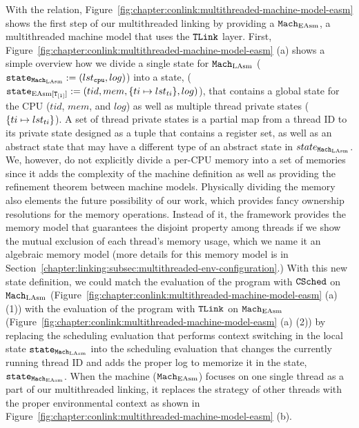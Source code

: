 With the relation, 
Figure~\ref{fig:chapter:conlink:multithreaded-machine-model-easm} shows
the first step of our multithreaded linking by providing 
a ${\mathrm{\texttt{Mach}}}_{\mathrm{EAsm}}$, a multithreaded machine model that uses the ${{\mathrm{\texttt{TLink}}}}$ layer.
First,  Figure~\ref{fig:chapter:conlink:multithreaded-machine-model-easm} (a)
shows a simple overview how we divide a single state for ${\mathrm{\texttt{Mach}}}_{\mathrm{LAsm}}$  (${\mathrm{\texttt{state}}}_{{\mathrm{\texttt{Mach}}}_{\mathrm{LAsm}}} := (lst_{{\mathrm{\texttt{cpu}}}}, log)$)
into a state, (${\mathrm{\texttt{state}}}_{\mathrm{EAsm}[{{\mathrm{\texttt{T}}}_{[1]}}]} := (tid, mem, \{ti \mapsto lst_{ti}\}, log)$),
that contains a global state for the CPU ($tid$, $mem$, and $log$) as well as 
multiple thread private states ($\{ti \mapsto lst_{ti}\}$).
A set of thread private states is a partial map from a thread ID to its private state designed as a tuple that contains
a register set, as well as an abstract state that may have a different type of an abstract state in $state_{{\mathrm{\texttt{Mach}}}_{\mathrm{LAsm}}}$. 
We, however, do not explicitly divide a per-CPU memory into a  set of memories since 
it adds the complexity of the machine definition as well as providing the 
refinement theorem between machine models.
Physically dividing the memory also elements the future possibility of our work, which provides fancy ownership resolutions
for the memory operations.
Instead of it, the framework provides the memory model 
that guarantees the disjoint property among threads if we show the mutual exclusion of each thread's memory usage, which we name it an algebraic memory model (more details for this memory model is in Section~\ref{chapter:linking:subsec:multithreaded-env-configuration}.)
With this new state definition, 
we could match the evaluation of the program with ${{\mathrm{\texttt{CSched}}}}$ on ${\mathrm{\texttt{Mach}}}_{\mathrm{LAsm}}$ (Figure~\ref{fig:chapter:conlink:multithreaded-machine-model-easm} (a) (1)) with  the evaluation of the program with ${{\mathrm{\texttt{TLink}}}}$ on ${\mathrm{\texttt{Mach}}}_{\mathrm{EAsm}}$
(Figure~\ref{fig:chapter:conlink:multithreaded-machine-model-easm} (a) (2)) 
by replacing the scheduling evaluation that performs context switching in the local state ${\mathrm{\texttt{state}}}_{{\mathrm{\texttt{Mach}}}_{\mathrm{LAsm}}}$
into  the scheduling evaluation that changes the currently running thread ID and 
adds the proper log to memorize it in the state, ${\mathrm{\texttt{state}}}_{{\mathrm{\texttt{Mach}}}_{\mathrm{EAsm}}}$.
When the machine (${\mathrm{\texttt{Mach}}}_{\mathrm{EAsm}}$) focuses on one single thread as a part of our multithreaded linking, 
it replaces the strategy of other threads with the proper environmental context as shown in Figure~\ref{fig:chapter:conlink:multithreaded-machine-model-easm} (b).

